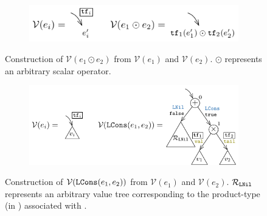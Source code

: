 \begin{figure}[t!]
\begin{subfigure}[b]{\textwidth}
\begin{center}
\includegraphics[scale=1.3]{chapters/figures/figValueTreeConvScalar.pdf}
\end{center}
\end{subfigure}
\vspace{5px}
\caption{\label{fig:valuetreeconvscalar}Construction of $\mathcal{V}(e_1 \odot e_2)$ from $\mathcal{V}(e_1)$ and $\mathcal{V}(e_2)$.
$\odot$ represents an arbitrary scalar operator.}
\begin{subfigure}[b]{\textwidth}
\begin{center}
\includegraphics[scale=1.3]{chapters/figures/figValueTreeConvCons.pdf}
\end{center}
\end{subfigure}
\vspace{5px}
\caption{\label{fig:valuetreeconvcons}Construction of $\mathcal{V}({\tt LCons}(e_1,e_2))$ from $\mathcal{V}(e_1)$ and $\mathcal{V}(e_2)$.
$\mathcal{R}_{\tt LNil}$ represents an arbitrary value tree corresponding to the product-type (in \typegrammar{}) associated with .}
\end{figure}

